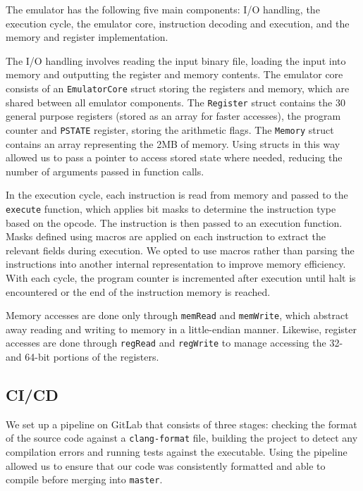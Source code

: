 \documentclass[11pt]{article}
\begin{document}
The emulator has the following five main components: I/O handling, the execution cycle, the emulator core, instruction decoding and execution, and the memory and register implementation.

The I/O handling involves reading the input binary file, loading the input into memory and outputting the register and memory contents. The emulator core consists of an \texttt{EmulatorCore} struct storing the registers and memory, which are shared between all emulator components. The \texttt{Register} struct contains the 30 general purpose registers (stored as an array for faster accesses), the program counter and \texttt{PSTATE} register, storing the arithmetic flags. The \texttt{Memory} struct contains an array representing the 2MB of memory. Using structs in this way allowed us to pass a pointer to access stored state where needed, reducing the number of arguments passed in function calls.

In the execution cycle, each instruction is read from memory and passed to the \texttt{execute} function, which applies bit masks to determine the instruction type based on the opcode. The instruction is then passed to an execution function. Masks defined using macros are applied on each instruction to extract the relevant fields during execution. We opted to use macros rather than parsing the instructions into another internal representation to improve memory efficiency. With each cycle, the program counter is incremented after execution until halt is encountered or the end of the instruction memory is reached.

Memory accesses are done only through \texttt{memRead} and \texttt{memWrite}, which abstract away reading and writing to memory in a little-endian manner. Likewise, register accesses are done through \texttt{regRead} and \texttt{regWrite} to manage accessing the 32- and 64-bit portions of the registers.

\subsection{CI/CD}

We set up a pipeline on GitLab that consists of three stages: checking the format of the source code against a \texttt{clang-format} file, building the project to detect any compilation errors and running tests against the executable. Using the pipeline allowed us to ensure that our code was consistently formatted and able to compile before merging into \texttt{master}.
\end{document}

